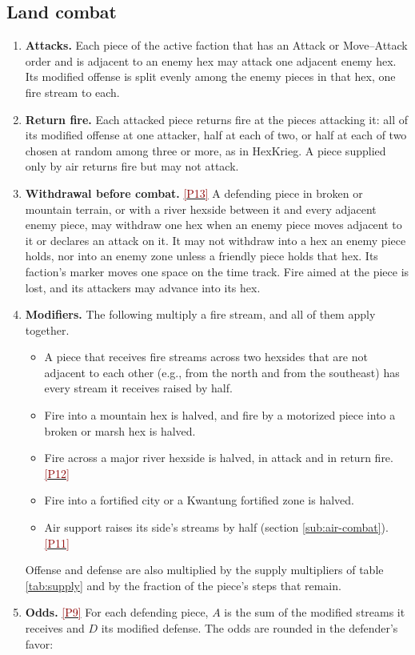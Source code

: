\documentclass[11pt]{article}
\newcommand{\ptest}[1]{\hyperlink{ptest}{\textcolor{darkred}{[P#1]}}}
\begin{document}
\subsection{Land combat}\label{sub:combat}
\begin{enumerate}
\item \textbf{Attacks.} Each piece of the active faction that has an Attack or Move--Attack order and is adjacent to an enemy hex may attack one adjacent enemy hex. Its modified offense is split evenly among the enemy pieces in that hex, one fire stream to each.
\item \textbf{Return fire.} Each attacked piece returns fire at the pieces attacking it: all of its modified offense at one attacker, half at each of two, or half at each of two chosen at random among three or more, as in HexKrieg. A piece supplied only by air returns fire but may not attack.
\item \textbf{Withdrawal before combat.} \ptest{13} A defending piece in broken or mountain terrain, or with a river hexside between it and every adjacent enemy piece, may withdraw one hex when an enemy piece moves adjacent to it or declares an attack on it. It may not withdraw into a hex an enemy piece holds, nor into an enemy zone unless a friendly piece holds that hex. Its faction's marker moves one space on the time track. Fire aimed at the piece is lost, and its attackers may advance into its hex.
\item \textbf{Modifiers.} The following multiply a fire stream, and all of them apply together.
\begin{itemize}
\item A piece that receives fire streams across two hexsides that are not adjacent to each other (e.g., from the north and from the southeast) has every stream it receives raised by half.
\item Fire into a mountain hex is halved, and fire by a motorized piece into a broken or marsh hex is halved.
\item Fire across a major river hexside is halved, in attack and in return fire. \ptest{12}
\item Fire into a fortified city or a Kwantung fortified zone is halved.
\item Air support raises its side's streams by half (section \ref{sub:air-combat}). \ptest{11}
\end{itemize}
Offense and defense are also multiplied by the supply multipliers of table \ref{tab:supply} and by the fraction of the piece's steps that remain.
\item \textbf{Odds.} \ptest{9} For each defending piece, $A$ is the sum of the modified streams it receives and $D$ its modified defense. The odds are rounded in the defender's favor:

\end{enumerate}
\end{document}

